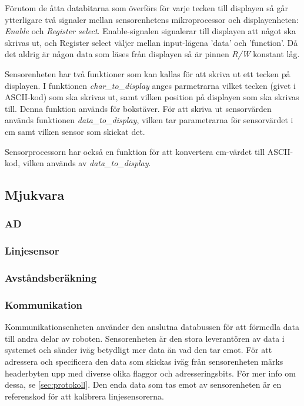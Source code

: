 Förutom de åtta databitarna som överförs för varje tecken till displayen så går ytterligare två signaler mellan sensorenhetens mikroprocessor och displayenheten: \emph{Enable} och \emph{Register select}. Enable-signalen signalerar till displayen att något ska skrivas ut, och Register select väljer mellan input-lägena 'data' och 'function'. Då det aldrig är någon data som läses från displayen så är pinnen \emph{R/W} konstant låg. 

Sensorenheten har två funktioner som kan kallas för att skriva ut ett tecken på displayen. I funktionen \emph{char\_to\_display} anges parmetrarna vilket tecken (givet i ASCII-kod) som ska skrivas ut, samt vilken position på displayen som ska skrivas till. Denna funktion används för bokstäver. För att skriva ut sensorvärden används funktionen \emph{data\_to\_display}, vilken tar parametrarna för sensorvärdet i cm samt vilken sensor som skickat det. 

Sensorprocessorn har också en funktion för att konvertera cm-värdet till ASCII-kod, vilken används av \emph{data\_to\_display}.

\subsection{Mjukvara}

\subsubsection{AD}

\subsubsection{Linjesensor}


\subsubsection{Avståndsberäkning}


\subsubsection{Kommunikation}
Kommunikationsenheten använder den anslutna databussen för att förmedla 
data till andra delar av roboten. Sensorenheten är den stora leverantören av 
data i systemet och sänder iväg betydligt mer data än vad den tar emot. För att 
adressera och specificera den data som skickas iväg från sensorenheten märks 
headerbyten upp med diverse olika flaggor och adresseringsbits. För mer info om 
dessa, se \ref{sec:protokoll}. Den enda data som tas emot av sensorenheten är en 
referenskod för att kalibrera linjesensorerna.

